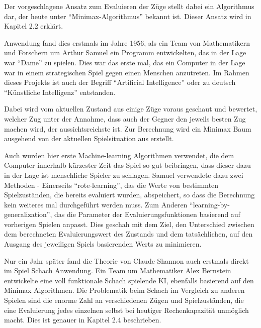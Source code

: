 Der vorgeschlagene Ansatz zum Evaluieren der Züge stellt dabei ein Algorithmus dar, der heute unter ``Minimax-Algorithmus'' bekannt ist. Dieser Ansatz wird in Kapitel 2.2 erklärt.


Anwendung fand dies erstmals im Jahre 1956, als ein Team von Mathematikern und Forschern um Arthur Samuel ein Programm entwickelten, das in der Lage war ``Dame'' zu spielen. Dies war das erste mal, das ein Computer in der Lage war in einem strategischen Spiel gegen einen Menschen anzutreten. Im Rahmen dieses Projekts ist auch der Begriff ``Artificial Intelligence'' oder zu deutsch ``Künstliche Intelligenz'' entstanden.

Dabei wird vom aktuellen Zustand aus einige Züge voraus geschaut und bewertet, welcher Zug unter der Annahme, dass auch der Gegner den jeweils besten Zug machen wird, der aussichtsreichste ist. Zur Berechnung wird ein Minimax Baum ausgehend von der aktuellen Spielsituation aus erstellt.


Auch wurden hier erste Machine-learning Algorithmen verwendet, die dem Computer innerhalb kürzester Zeit das Spiel so gut beibringen, dass dieser dazu in der Lage ist menschliche Spieler zu schlagen. Samuel verwendete dazu zwei Methoden - Einerseits ``rote-learning'', das die Werte von bestimmten Spielzuständen, die bereits evaluiert wurden, abspeichert, so dass die Berechnung kein weiteres mal durchgeführt werden muss. Zum Anderen ``learning-by-generalization'', das die Parameter der Evaluierungsfunktionen basierend auf vorherigen Spielen anpasst. Dies geschah mit dem Ziel, den Unterschied zwischen dem berechneten Evaluierungswert des Zustands und dem tatsächlichen, auf den Ausgang des jeweiligen Spiels basierenden Werts zu minimieren.


Nur ein Jahr später fand die Theorie von Claude Shannon auch erstmals direkt im Spiel Schach Anwendung. Ein Team um Mathematiker Alex Bernstein entwickelte eine voll funktionale Schach spielende KI, ebenfalls basierend auf den Minimax Algorithmen. Die Problematik beim Schach im Vergleich zu anderen Spielen sind die enorme Zahl an verschiedenen Zügen und Spielzuständen, die eine Evaluierung jedes einzelnen selbst bei heutiger Rechenkapazität unmöglich macht. Dies ist genauer in Kapitel 2.4 beschrieben.

